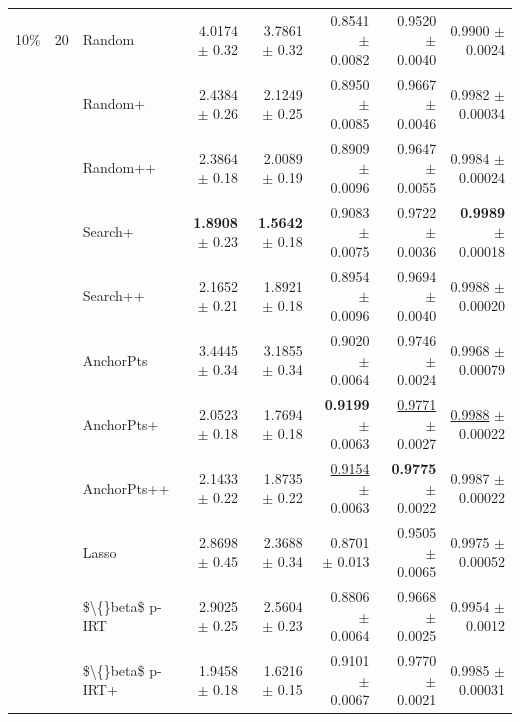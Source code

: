 \begin{longtable}{llp{}rrrrr}
\midrule
10\% & 20 & Random & 4.0174 {\scriptsize $\pm$ 0.32} & 3.7861 {\scriptsize $\pm$ 0.32} & 0.8541 {\scriptsize $\pm$ 0.0082} & 0.9520 {\scriptsize $\pm$ 0.0040} & 0.9900 {\scriptsize $\pm$ 0.0024} \\
 &  & Random+ & 2.4384 {\scriptsize $\pm$ 0.26} & 2.1249 {\scriptsize $\pm$ 0.25} & 0.8950 {\scriptsize $\pm$ 0.0085} & 0.9667 {\scriptsize $\pm$ 0.0046} & 0.9982 {\scriptsize $\pm$ 0.00034} \\
 &  & Random++ & 2.3864 {\scriptsize $\pm$ 0.18} & 2.0089 {\scriptsize $\pm$ 0.19} & 0.8909 {\scriptsize $\pm$ 0.0096} & 0.9647 {\scriptsize $\pm$ 0.0055} & 0.9984 {\scriptsize $\pm$ 0.00024} \\
 &  & Search+ & \textbf{1.8908} {\scriptsize $\pm$ 0.23} & \textbf{1.5642} {\scriptsize $\pm$ 0.18} & 0.9083 {\scriptsize $\pm$ 0.0075} & 0.9722 {\scriptsize $\pm$ 0.0036} & \textbf{0.9989} {\scriptsize $\pm$ 0.00018} \\
 &  & Search++ & 2.1652 {\scriptsize $\pm$ 0.21} & 1.8921 {\scriptsize $\pm$ 0.18} & 0.8954 {\scriptsize $\pm$ 0.0096} & 0.9694 {\scriptsize $\pm$ 0.0040} & 0.9988 {\scriptsize $\pm$ 0.00020} \\
 &  & AnchorPts & 3.4445 {\scriptsize $\pm$ 0.34} & 3.1855 {\scriptsize $\pm$ 0.34} & 0.9020 {\scriptsize $\pm$ 0.0064} & 0.9746 {\scriptsize $\pm$ 0.0024} & 0.9968 {\scriptsize $\pm$ 0.00079} \\
 &  & AnchorPts+ & 2.0523 {\scriptsize $\pm$ 0.18} & 1.7694 {\scriptsize $\pm$ 0.18} & \textbf{0.9199} {\scriptsize $\pm$ 0.0063} & \underline{0.9771} {\scriptsize $\pm$ 0.0027} & \underline{0.9988} {\scriptsize $\pm$ 0.00022} \\
 &  & AnchorPts++ & 2.1433 {\scriptsize $\pm$ 0.22} & 1.8735 {\scriptsize $\pm$ 0.22} & \underline{0.9154} {\scriptsize $\pm$ 0.0063} & \textbf{0.9775} {\scriptsize $\pm$ 0.0022} & 0.9987 {\scriptsize $\pm$ 0.00022} \\
 &  & Lasso & 2.8698 {\scriptsize $\pm$ 0.45} & 2.3688 {\scriptsize $\pm$ 0.34} & 0.8701 {\scriptsize $\pm$ 0.013} & 0.9505 {\scriptsize $\pm$ 0.0065} & 0.9975 {\scriptsize $\pm$ 0.00052} \\
 &  & \$\textbackslash\{\}beta\$ p-IRT & 2.9025 {\scriptsize $\pm$ 0.25} & 2.5604 {\scriptsize $\pm$ 0.23} & 0.8806 {\scriptsize $\pm$ 0.0064} & 0.9668 {\scriptsize $\pm$ 0.0025} & 0.9954 {\scriptsize $\pm$ 0.0012} \\
 &  & \$\textbackslash\{\}beta\$ p-IRT+ & 1.9458 {\scriptsize $\pm$ 0.18} & 1.6216 {\scriptsize $\pm$ 0.15} & 0.9101 {\scriptsize $\pm$ 0.0067} & 0.9770 {\scriptsize $\pm$ 0.0021} & 0.9985 {\scriptsize $\pm$ 0.00031} \\

\end{longtable}
